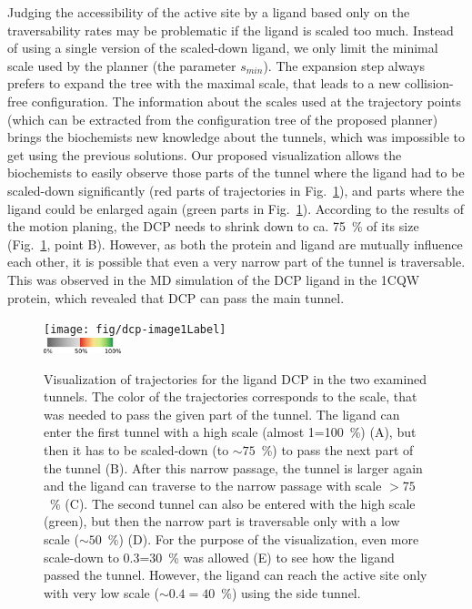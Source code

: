 \documentclass[usletter, 10pt, conference]{ieeeconf} %
\def\smin{s_{min}}
\begin{document}
Judging the accessibility of the active site by a ligand based only on the traversability rates may be problematic if the ligand is scaled too much.
Instead of using a single version of the scaled-down ligand, we only limit the minimal scale used by the planner (the parameter $\smin$).
The expansion step always prefers to expand the tree with the maximal scale, that leads to a new collision-free configuration.
The information about the scales used at the trajectory points (which can be extracted from the configuration tree of the proposed planner) brings the biochemists new knowledge about the tunnels, which was impossible to get using the previous solutions.
Our proposed visualization allows the biochemists to easily observe those parts of the tunnel where the ligand had to be scaled-down significantly (red parts of trajectories in Fig.~\ref{fig::dcp}), and parts where the ligand could be enlarged again (green parts in Fig.~\ref{fig::dcp}).
According to the results of the motion planing, the DCP needs to shrink down to ca. 75~\% of its size (Fig.~\ref{fig::dcp}, point B).
However, as both the protein and ligand are mutually influence each other, it is possible that even a very narrow part of the tunnel is traversable.
This was observed in the MD simulation of the DCP ligand in the 1CQW protein, which revealed that DCP can pass the main tunnel.

\begin{figure}
\centering
\texttt{[image: fig/dcp-image1Label]}\\
\includegraphics[width=0.2\textwidth]{fig/colormap}
\caption{\label{fig::dcp}
Visualization of trajectories for the ligand DCP in the two examined tunnels.  
The color of the trajectories corresponds to the scale, that was needed to pass the given part of the tunnel.
The ligand can enter the first tunnel with a high scale (almost 1=100~\%) (A), but then it has to be scaled-down (to $\sim75$~\%) to pass the
next part of the tunnel (B). After this narrow passage, the tunnel is larger again and the ligand can traverse to the narrow passage with
scale $>75$~\% (C).
The second tunnel can also be entered with the high scale (green), but then the narrow part is traversable only with a low scale ($\sim50$~\%) (D). 
For the purpose of the visualization, even more scale-down to 0.3=30~\% was allowed (E) to see how the ligand passed the tunnel.
However, the ligand can reach the active site only with very low scale ($\sim0.4=40$~\%) using the side tunnel.
}
\end{figure}
\end{document}
